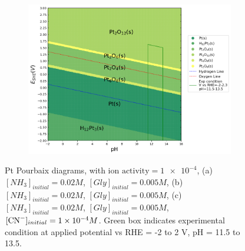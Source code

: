 \documentclass[journal=jacsat,manuscript=article]{achemso}
\begin{document}
\begin{figure}[htbp]
\begin{subfigure}[b]{0.3\textwidth}
    \end{subfigure}
    \begin{subfigure}[b]{0.3\textwidth}
        \subcaption{}\label{fig:Pt_Pourbaix_NH3_Gly_CN}
        \includegraphics[width=\textwidth]{Figures/pourbaix_diagrams/Pt-NH3-H2O_activity=1e-04_[NH3]=0.02M_[Gly]=0.005M_[CN]=0.0001.png}
        \par\medskip   
    \end{subfigure}

    \caption{Pt Pourbaix diagrams, with $\text{ion activity}=\num{1e-4}$, (a)$[NH_3]_{initial}= 0.02M$, $[Gly]_{initial}=0.005M$, (b)$[NH_3]_{initial}= 0.02M$, $[Gly]_{initial}=0.005M$, (c)$[NH_3]_{initial}= 0.02M$, $[Gly]_{initial}=0.005M$, $[\ce{CN-}]_{initial}=\num{1e-4}M$. Green box indicates experimental condition at applied potential vs RHE = -2 to 2 V, pH = 11.5 to 13.5.}
    \label{fig:Pt_Pourbaix}
\end{figure}
\end{document}
